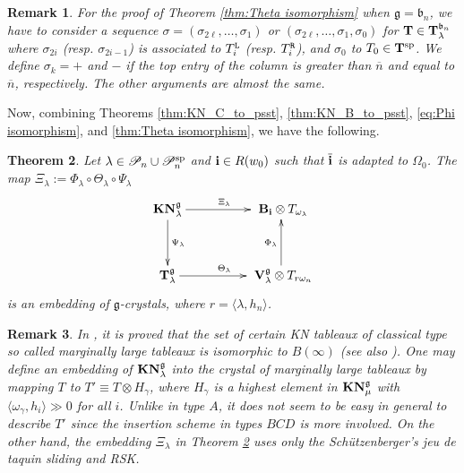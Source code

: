 \documentclass[leqno,11pt]{amsart}
\newtheorem{thm}{\bf Theorem}[section]
\newtheorem{rem}[thm]{\bf Remark}
\numberwithin{equation}{section}
\newcommand{\bs}{\boldsymbol}
\newcommand{\B}{\mathbf{B}}
\newcommand{\cP}{\mathscr{P}}
\newcommand{\ov}{\overline}
\newcommand{\bi}{\bs{\rm i}}
\newcommand{\g}{\mathfrak{g}}
\newcommand{\mf}{\mathfrak}
\newcommand{\la}{\lambda}
\begin{document}
\begin{rem}{\rm For the proof of Theorem \ref{thm:Theta isomorphism} when $\g=\mf b_n$, we have to consider a sequence $\sigma=(\sigma_{2\ell},\ldots,\sigma_1)$ or 
$(\sigma_{2\ell},\ldots,\sigma_1,\sigma_0)$ for ${\bf T}\in {\bf T}^{\mf b_n}_\la$ where $\sigma_{2i}$ (resp. $\sigma_{2i-1}$) is associated to $T^{\tt L}_i$ (resp. $T^{\tt R}_i$), and $\sigma_0$ to $T_0\in {\bf T}^{\rm sp}$. We define $\sigma_k= +$ and $-$ if the top entry of the column is greater than $\ov{n}$ and equal to $\ov{n}$, respectively. The other arguments are almost the same.  
}
\end{rem}


Now, combining Theorems \ref{thm:KN_C_to_psst}, \ref{thm:KN_B_to_psst}, \ref{eq:Phi isomorphism}, and \ref{thm:Theta isomorphism}, we have the following.

\begin{thm}\label{thm:main}
Let $\la\in \cP_n\cup \cP_n^{\rm sp}$ and $\bi\in R(w_0)$ such that $\ov{\bi}$ is adapted to $\Omega_0$. The map 
$\Xi_\la:=\Phi_\la\circ\Theta_\la\circ\Psi_\la$
\begin{equation*}
\xymatrixcolsep{4pc}\xymatrixrowsep{3pc}\xymatrix{
{\bf KN}_\la^\g \ar@{->}^{\Xi_\la }[r] \ar@{->}^{\Psi_\la }[d] &\ \B_{\bi}\otimes T_{\omega_\la} \\  
{\bf T}^{\g}_\la  \ar@{->}^{\Theta_\la }[r] &\ {\bf V}^\g_\la \otimes T_{r\omega_n} \ar@{->}^{\Phi_\la }[u]   }
\end{equation*}
is an embedding of $\g$-crystals, where $r=\langle \la,h_n \rangle$. 
\end{thm}

\begin{rem}\label{rem:related works}
{\rm
In \cite{HL}, it is proved that the set of certain KN tableaux of classical type so called {\em marginally large tableaux} is isomorphic to $B(\infty)$ (see also \cite{C}). 
One may define an embedding of ${\bf KN}_\la^\g$ into the crystal of marginally large tableaux by mapping $T$ to $T'\equiv T\otimes H_\gamma$, where $H_\gamma$ is a highest element in ${\bf KN}_\mu^\g$ with $\langle \omega_\gamma,h_i \rangle \gg 0$ for all $i$. 
Unlike in  type $A$, it does not seem to be easy in general to describe $T'$ since the insertion scheme in types $BCD$ \cite{Le02,Le03} is more involved. 
On the other hand, the embedding $\Xi_\la$ in Theorem \ref{thm:main} uses only the Sch\"{u}tzenberger's jeu de taquin sliding and RSK. }
\end{rem}
\end{document}

